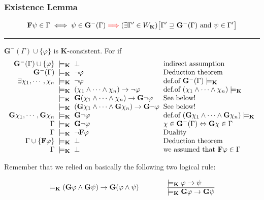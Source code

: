 \documentclass[xcolor=x11names]{beamer}
\newcommand{\hazi}[6]{\begin{tikzpicture}[remember picture,overlay]
\node [ draw=Coral1,
        rectangle,
        rounded corners=#2 mm,
        inner sep=#1mm,
        ultra thick,
        fill=white,
        fill opacity=.8,
        rotate=0,
        scale=#3,
        text opacity=1]
        at ([xshift=#4 cm, yshift=#5 cm]current page.center)
        {#6};
\end{tikzpicture}}
\newcommand{\cemph}[1]{\textcolor{red}{#1}}
\newcommand{\FD}{\mathbf F}
\newcommand{\FB}{\mathbf G}
\newcommand{\lthen}{\rightarrow}
\newcommand{\existsin}[2]{(\exists #1 \in #2)}
\newenvironment{tomb}[2][.1]{\arraycolsep=#1cm\begin{array}{#2}}{\end{array}}
\begin{document}
\begin{frame}
\frametitle{Existence Lemma}

\[\FD \psi \in \Gamma  \iff  \psi \in \FB^-(\Gamma) \mathrel{\cemph{\Longrightarrow}} \existsin {\Gamma'}{W_\mathbf K} \big[\Gamma' \supseteq \FB^-(\Gamma) \textup{ and } \psi \in \Gamma' \big]\]

\hrule
\medskip

$\FB^- (\Gamma) \cup \{\varphi\}$ is $\mathbf K$-consistent. For if
\[ \begin{tomb}{rcll}
   \FB^- (\Gamma) \cup \{\varphi\}&\models_{\mathbf K}&\bot &\textup{indirect assumption}
\\ \FB^- (\Gamma)&\models_{\mathbf K}& \lnot \varphi &\textup{Deduction theorem}
\\ \exists \chi_1,  \cdots,\chi_{n}&\models_{\mathbf K}& \lnot \varphi &\textup{def.of $\FB^- (\Gamma)\models_{\mathbf K}$}
\\ &\models_{\mathbf K}& (\chi_1 \land \dots \land \chi_{n}) \lthen \lnot \varphi &\textup{def.of $(\chi_1 \land \dots \land \chi_{n})\models_{\mathbf K}$}
\\ &\models_{\mathbf K}& \FB (\chi_1 \land \dots \land \chi_{n}) \lthen \FB \lnot \varphi &\textup{See below!}
\\ &\models_{\mathbf K}& (\FB \chi_1 \land \dots \land \FB\chi_{n})\lthen \FB \lnot \varphi &\textup{See below!}
\\ \FB \chi_1, \cdots ,\FB\chi_{n} &\models_{\mathbf K}& \FB \lnot \varphi & \textup{def.of $(\FB \chi_1 \land \dots \land \FB \chi_{n})\models_{\mathbf K}$}
\\ \Gamma &\models_{\mathbf K}& \FB \lnot \varphi &\chi\in \FB^-(\Gamma) \Leftrightarrow \FB \chi\in \Gamma
\\ \Gamma &\models_{\mathbf K}& \lnot \FD\varphi &\textup{Duality}
\\ \Gamma \cup \{ \FD\varphi \}&\models_{\mathbf K}& \bot &\textup{Deduction theorem}
\\ \Gamma &\models_{\mathbf K}& \bot &\textup{we assumed that $\FD \varphi \in \Gamma$}
\end{tomb}\]

Remember that we relied on basically the following two logical rule:

\[ \models_{\mathbf K}(\FB \varphi \land \FB \psi) \lthen \FB (\varphi \land \psi ) \qquad \qquad \begin{tomb}[0]{l} \models_{\mathbf K} \varphi \lthen \psi \\ \hline \models_{\mathbf K} \FB \varphi \lthen \FB \psi \end{tomb}\]

\end{frame}
\end{document}
